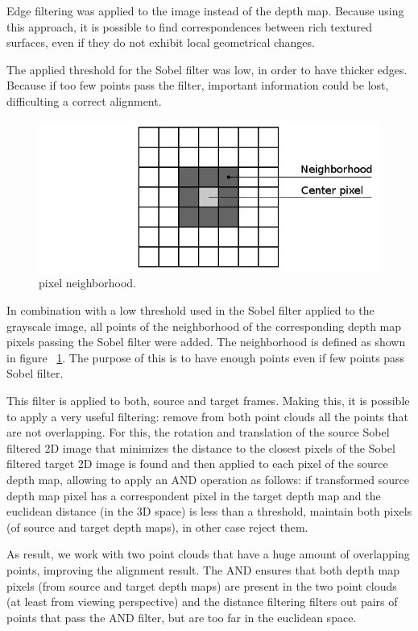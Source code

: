 Edge filtering was applied
to the image instead of the depth map. Because using this approach, it is possible to find correspondences between rich textured 
surfaces, even if they do not exhibit local geometrical changes.

The applied threshold for the Sobel filter was low, in order to have thicker edges. Because if too few points pass the filter, important information 
could be lost, difficulting a correct alignment.


\begin{figure}
\begin{center}
\includegraphics[scale=0.4]{images/vecindario}
\end{center}
\caption{pixel neighborhood.}
\label{fig:neighbor}
\end{figure}

In combination with a low threshold used in the Sobel filter applied to the grayscale image, all points of the neighborhood of the corresponding depth map pixels passing the Sobel filter were added. 
The neighborhood is defined as shown in figure ~\ref{fig:neighbor}. The purpose of this is to have enough points even if few points
 pass Sobel filter.

This filter is applied to both, source and target frames. Making this, it is possible to apply a very useful filtering: remove 
from both point clouds all the points that are not overlapping. For this, the rotation and translation 
of the source Sobel filtered 2D image that minimizes the distance to the closest pixels of the Sobel filtered target 2D image is found and 
then applied to each pixel of the source depth map, 
allowing to apply an AND operation as follows: if transformed source depth map pixel has a correspondent pixel in the target depth map and 
the euclidean distance (in the 3D space) is less than a threshold, maintain both pixels (of source and target depth maps), in other case reject them. 

 As result, we work with two point clouds that have a huge amount of overlapping points, improving the alignment 
result. The AND ensures that both depth map pixels (from source and target depth maps) are present in the two point clouds (at least from viewing 
perspective) and the distance filtering filters out pairs of points that pass the AND filter, but are too far in the euclidean space.

